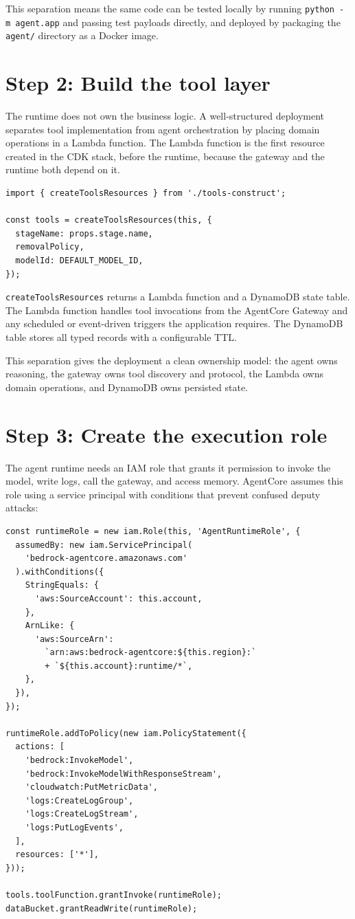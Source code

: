 This separation means the same code can be tested locally by running
\texttt{python~-m~agent.app} and passing test payloads directly, and deployed by
packaging the \texttt{agent/} directory as a Docker image.

\section{Step 2: Build the tool layer}

The runtime does not own the business logic. A well-structured deployment separates tool
implementation from agent orchestration by placing domain operations in a Lambda
function. The Lambda function is the first resource created in the CDK stack, before the
runtime, because the gateway and the runtime both depend on it.

\begin{lstlisting}
import { createToolsResources } from './tools-construct';

const tools = createToolsResources(this, {
  stageName: props.stage.name,
  removalPolicy,
  modelId: DEFAULT_MODEL_ID,
});
\end{lstlisting}

\texttt{createToolsResources} returns a Lambda function and a DynamoDB state table. The
Lambda function handles tool invocations from the AgentCore Gateway and any scheduled or
event-driven triggers the application requires. The DynamoDB table stores all typed
records with a configurable TTL.

This separation gives the deployment a clean ownership model: the agent owns reasoning,
the gateway owns tool discovery and protocol, the Lambda owns domain operations, and
DynamoDB owns persisted state.

\section{Step 3: Create the execution role}

The agent runtime needs an IAM role that grants it permission to invoke the model, write
logs, call the gateway, and access memory. AgentCore assumes this role using a service
principal with conditions that prevent confused deputy attacks:

\begin{lstlisting}
const runtimeRole = new iam.Role(this, 'AgentRuntimeRole', {
  assumedBy: new iam.ServicePrincipal(
    'bedrock-agentcore.amazonaws.com'
  ).withConditions({
    StringEquals: {
      'aws:SourceAccount': this.account,
    },
    ArnLike: {
      'aws:SourceArn':
        `arn:aws:bedrock-agentcore:${this.region}:`
        + `${this.account}:runtime/*`,
    },
  }),
});

runtimeRole.addToPolicy(new iam.PolicyStatement({
  actions: [
    'bedrock:InvokeModel',
    'bedrock:InvokeModelWithResponseStream',
    'cloudwatch:PutMetricData',
    'logs:CreateLogGroup',
    'logs:CreateLogStream',
    'logs:PutLogEvents',
  ],
  resources: ['*'],
}));

tools.toolFunction.grantInvoke(runtimeRole);
dataBucket.grantReadWrite(runtimeRole);
\end{lstlisting}

